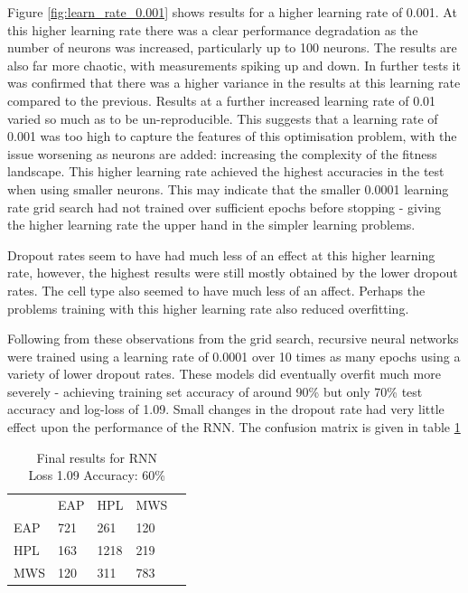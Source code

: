     Figure \ref{fig:learn_rate_0.001} shows results for a higher learning rate
    of 0.001. At this higher learning rate there was a clear performance
    degradation as the number of neurons was increased, particularly up to 100
    neurons. The results are also far more chaotic, with measurements spiking up
    and down. In further tests it was confirmed that there was a higher variance in
    the results at this learning rate compared to the previous. Results at a
    further increased learning rate of 0.01 varied so much as to be
    un-reproducible. This suggests that a learning rate of 0.001 was too high to
    capture the features of this optimisation problem, with the issue worsening
    as neurons are added: increasing the complexity of the fitness landscape.
    This higher learning rate achieved the highest accuracies in the test when
    using smaller neurons. This may indicate that the smaller 0.0001 learning rate grid
    search had not trained over sufficient epochs before stopping - giving the
    higher learning rate the upper hand in the simpler learning problems.

    Dropout rates seem to have had much less of an effect at this higher
    learning rate, however, the highest results were still mostly obtained by
    the lower dropout rates. The cell type also seemed to have much less of an
    affect. Perhaps the problems training with this higher learning rate also
    reduced overfitting.

    Following from these observations from the grid search, recursive neural
    networks were trained using a learning rate of 0.0001 over 10 times as many
    epochs using a variety of lower dropout rates. These models did eventually
    overfit much more severely - achieving training set accuracy of around 90\%
    but only 70\% test accuracy and log-loss of 1.09. Small changes in the
    dropout rate had very little effect upon the performance of the RNN. The
    confusion matrix is given in table \ref{tab:rnn_res}

\begin{table}[h]
\centering
\begin{tabular}{m{1cm}|m{1cm}|m{1cm}|m{1cm}|m{0cm}}
\multicolumn{1}{m{1cm}}{} & \multicolumn{1}{m{1cm}}{EAP} & \multicolumn{1}{m{1cm}}{HPL} & \multicolumn{1}{m{1cm}}{MWS} &\\[5pt]
\cline{2-4}
EAP & 721 & 261 & 120 & \\[5pt]
\cline{2-4}
HPL & 163 & 1218 & 219 & \\[5pt]
\cline{2-4}
MWS & 120 & 311 & 783 & \\[5pt]
\cline{2-4}
\end{tabular}
\caption{Final results for RNN\\Loss 1.09 Accuracy: 60\% }
\label{tab:rnn_res}
\end{table}


